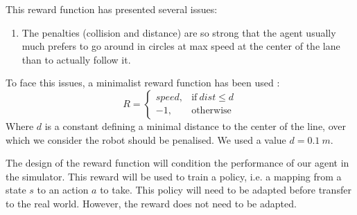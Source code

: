 This reward function has presented several issues:

\begin{enumerate}
    \item The penalties (collision and distance) are so strong that the agent usually much prefers to go around in circles at max speed at the center of the lane than to actually follow it.
\end{enumerate}

To face this issues, a minimalist reward function has been used :
\begin{equation}
    R =
    \begin{cases}
        speed, & \text{if}\ dist \leq d\\
        -1, & \text{otherwise}
    \end{cases}
\end{equation}
Where $d$ is a constant defining a minimal distance to the center of the line, over which we consider the robot should be penalised. We used a value $d=0.1\ m$.

The design of the reward function will condition the performance of our agent in the simulator.
This reward will be used to train a policy, i.e. a mapping from a state $s$ to an action $a$ to take.
This policy will need to be adapted before transfer to the real world.
However, the reward does not need to be adapted.
